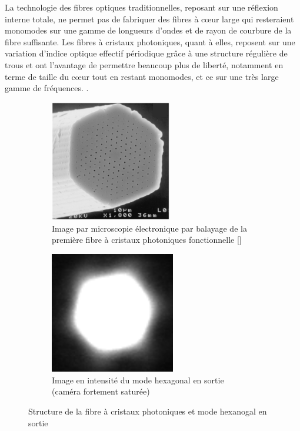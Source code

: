 \documentclass[11pt,a4paper]{article}
\newcommand{\ncite}[1]{[\citenum{#1}]}
\begin{document}
La technologie des fibres optiques traditionnelles, reposant sur une réflexion interne totale, ne permet pas de fabriquer des fibres à c\oe ur large qui resteraient monomodes sur une gamme de longueurs d'ondes et de rayon de courbure de la fibre suffisante. 
Les fibres à cristaux photoniques, quant à elles, reposent sur une variation d'indice optique effectif périodique grâce à une structure régulière de trous et ont l'avantage de permettre beaucoup plus de liberté, notamment en terme de taille du c\oe ur tout en restant monomodes, et ce sur une très large gamme de fréquences.  
\citep{russell2006,russell2007}.


\begin{figure}[htpb]  
\centering
\hspace*{0.4cm}
\begin{subfigure}[t]{0.38\textwidth}
	\centering
	\includegraphics[height=5.3cm]{./img/solid core PCF - russell2006}
	\caption{Image par microscopie électronique par balayage de la première fibre à cristaux photoniques fonctionnelle \ncite{russell2006}}
	\label{fig:PCF}
\end{subfigure}
\hspace*{0.4cm}
\begin{subfigure}[t]{0.37\textwidth}
	\centering
	\includegraphics[height=5.3cm]{./img/mode hexa.png}
	\caption{Image en intensité du mode hexagonal en sortie (caméra fortement saturée)}
	\label{fig:hexa}
\end{subfigure}
\hspace*{-0.8cm}
\caption{Structure de la fibre à cristaux photoniques et mode hexanogal en sortie}
\end{figure}
\end{document}
